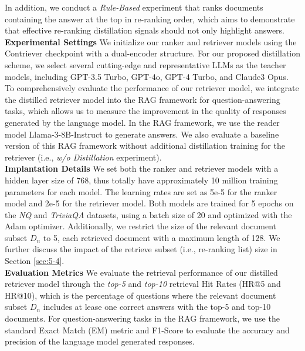 In addition, we conduct a \textit{Rule-Based} experiment that ranks documents containing the answer at the top in re-ranking order, which aims to demonstrate that effective re-ranking distillation signals should not only highlight answers.\\
\textbf{Experimental Settings} 
We initialize our ranker and retriever models using the Contriever checkpoint \cite{izacard2022unsupervised} with a dual-encoder structure.
For our proposed distillation scheme, we select several cutting-edge and representative LLMs as the teacher models, including GPT-3.5 Turbo, GPT-4o, GPT-4 Turbo, and Claude3 Opus.
To comprehensively evaluate the performance of our retriever model, we integrate the distilled retriever model into the RAG framework for question-answering tasks, which allows us to measure the improvement in the quality of responses generated by the language model. 
In the RAG framework, we use the reader model Llama-3-8B-Instruct \cite{touvron2023llama} to generate answers.
We also evaluate a baseline version of this RAG framework without additional distillation training for the retriever (i.e., \textit{w/o Distillation} experiment). \\
\textbf{Implantation Details} We set both the ranker and retriever models with a hidden layer size of 768, thus totally have approximately 10 million training parameters for each model.
The learning rates are set as 5e-5 for the ranker model and 2e-5 for the retriever model. 
Both models are trained for 5 epochs on the \textit{NQ} and \textit{TriviaQA} datasets, using a batch size of 20 and optimized with the Adam optimizer.
Additionally, we restrict the size of the relevant document subset $D_n$ to 5, each retrieved document with a maximum length of 128. We further discuss the impact of the retrieve subset (i.e., re-ranking list) size in Section \ref{sec:5-4}.
\\
\textbf{Evaluation Metrics} We evaluate the retrieval performance of our distilled retriever model through the \textit{top-5} and \textit{top-10} retrieval Hit Rates (HR@5 and HR@10), which is the percentage of questions where the relevant document subset $D_n$ includes at lease one correct answers with the top-5 and top-10 documents.
For question-answering tasks in the RAG framework, we use the standard Exact Match (EM) metric and F1-Score to evaluate the accuracy and precision of the language model generated responses.

